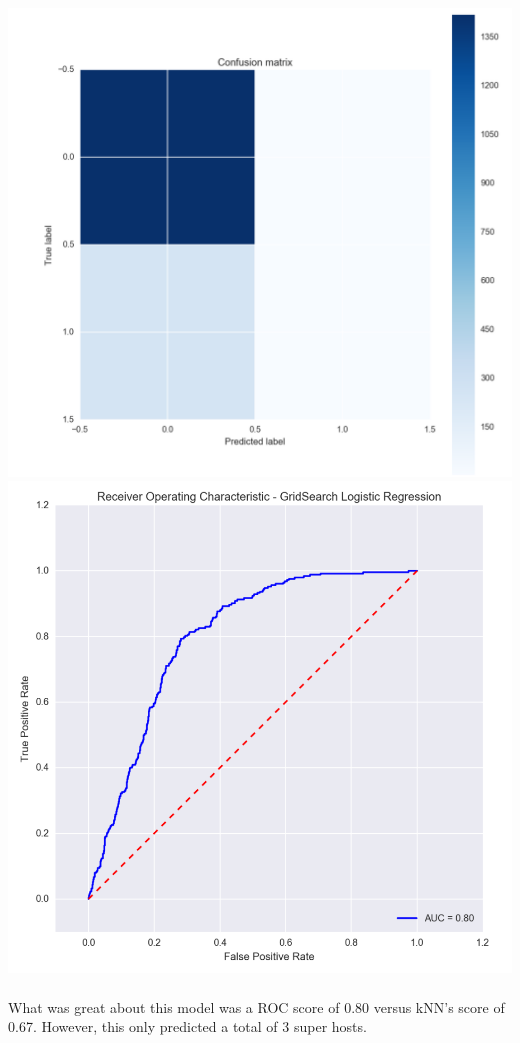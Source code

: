 \documentclass[10pt,letterpapter]{article}
\begin{document}
\begin{paragraph}
\includegraphics[scale=0.30]{logisticcm.png} 
\includegraphics[scale=0.50]{logisticroc.png}
\\ \\
What was great about this model was a ROC score of 0.80 versus kNN's score of 0.67. However, this only predicted a total of 3 super hosts.

\end{paragraph}
\end{document}
